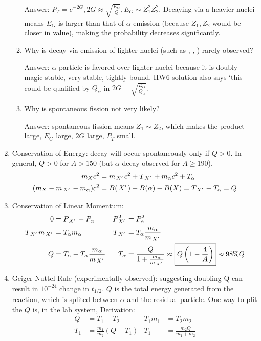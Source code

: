 \documentclass{school-22.101-notes}
\begin{document}
\begin{enumerate}
\begin{enumerate}
Answer: $P_T = e^{-2G}, 2G \approx \sqrt{\frac{E_G}{Q}}, E_G \sim Z_1^2 Z_2^2$. Decaying via a heavier nuclei means $E_G$ is larger than that of $\alpha$ emission (because $Z_1, Z_2$ would be closer in value), making the probability decreases significantly. 
\item Why is decay via emission of lighter nuclei (such as , , ) rarely observed?

Answer: $\alpha$ particle is favored over lighter nuclei because it is doubly magic stable, very stable, tightly bound. HW6 solution also says `this could be qualified by $Q_{\alpha}$ in $2G = \sqrt{\frac{E_G}{Q_{\alpha}}}$. 
\item Why is spontaneous fission not very likely?

Answer: spontaneous fission means $Z_1 \sim Z_2$, which makes the product large, $E_G$ large, $2G$ large, $P_T$ small. 
\end{enumerate}
%

\item Conservation of Energy: decay will occur spontaneously only if $Q >0$. In general, $Q>0$ for $A > 150$ (but $\alpha$ decay observed for $A \ge 190$). 
\begin{align}
m_X c^2 &= m_{\left.X^{\prime}\right.} c^2 + T_{\left.X^{\prime}\right.} + m_{\alpha} c^2 + T_{\alpha} \\
(m_X - m_{\left.X^{\prime}\right.} - m_{\alpha} ) c^2 &= B(\left.X^{\prime}\right.) + B(\alpha) - B(X) =  T_{\left.X^{\prime}\right.} + T_{\alpha} = Q \label{Q-alpha}
\end{align}

\item Conservation of Linear Momentum:
\begin{align}
0 &= P_{\left.X^{\prime}\right.} - P_{\alpha}  & P_{\left.X^{\prime}\right.}^2 &= P_{\alpha}^2 \\
T_{\left.X^{\prime}\right.} m_{\left.X^{\prime}\right.} &= T_{\alpha} m_{\alpha}  & T_{\left.X^{\prime}\right.} &= T_{\alpha} \frac{m_{\alpha}}{m_{\left.X^{\prime}\right.}} \\
Q &= T_{\alpha} + T_{\alpha} \frac{m_{\alpha}}{m_{\left.X^{\prime}\right.}}  & T_{\alpha} &= \frac{Q}{1 + \frac{m_{\alpha}}{m_{\left.X^{\prime}\right.}}}  \approx \boxed{ Q \left( 1 - \frac{4}{A} \right) } \approx 98\% Q
\end{align}
\item Geiger-Nuttel Rule (experimentally observed): suggesting doubling Q can result in $10^{-24}$ change in $t_{1/2}$. $Q$ is the total energy generated from the reaction, which is splited between $\alpha$ and the residual particle. 
One way to plit the $Q$ is, in the lab system, 
Derivation: 
\begin{align}
Q &= T_1 + T_2 & T_1 m_1 &= T_2 m_2 \\
T_1 &= \frac{m_1}{m_2} (Q - T_1) & T_1 &= \frac{m_2 Q}{m_1 + m_2} 
\end{align}


\end{enumerate}
\end{document}
